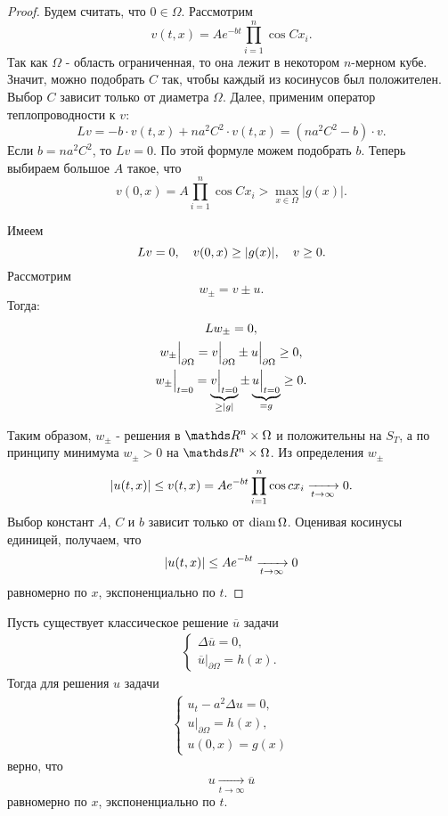 \begin{proof}
Будем считать, что $0 \in \Omega$. Рассмотрим
$$ v(t,x) = A e^{-bt} \prod \limits_{i=1}^n \cos C x_i. $$
Так как $\Omega$ - область ограниченная, то она лежит в некотором $n$-мерном кубе. Значит, можно подобрать $C$ так, чтобы каждый из косинусов был положителен. Выбор $C$ зависит только от диаметра $\Omega$. Далее, применим оператор теплопроводности к $v$:
$$ Lv = -b \cdot v(t,x) + n a^2 C^2 \cdot v(t,x) = (na^2C^2 - b) \cdot v.$$
Если $b = n a^2 C^2$, то $Lv = 0$. По этой формуле можем подобрать $b$. Теперь выбираем большое $A$ такое, что
$$ v(0,x) = A \prod \limits_{i=1}^n \cos C x_i > \max_{x \in \Omega} |g(x)|.$$

Имеем $$Lv = 0,\quad v(0,x) \geq \lvert g(x)\rvert,\quad v \geq 0 .$$ Рассмотрим
$$ w_{\pm} = v \pm u.$$
Тогда:
\begin{gather*}
	Lw_{\pm} = 0, \\
	w_{\pm}\Big\rvert_{\partial \Omega} = v\Big\rvert_{\partial \Omega} \pm u\Big\rvert_{\partial \Omega} \geq 0, \\
	w_{\pm}\Big\rvert_{t=0} = \underbrace {v\Big\rvert_{t=0}}_{\geq \lvert g\rvert} \pm \underbrace{u\Big\rvert_{t=0}}_{=g} \geq 0.
\end{gather*}

Таким образом, $w_{\pm}$ - решения в $\real^n \times \Omega$ и положительны на $S_T$, а по принципу минимума $w_{\pm} > 0$  на $\real^n \times \Omega$. Из определения $w_{\pm}$ 
$$\lvert u(t,x)\rvert \leq v(t,x) = A e^{-bt} \prod \limits_{i=1}^n \cos c x_i \xrightarrow[t \to \infty]{} 0.$$
Выбор констант $A$, $C$ и $b$ зависит только от $\operatorname{diam} \Omega$. Оценивая косинусы единицей, получаем, что
$$ \lvert u(t,x)\rvert \leq A e^{-bt} \xrightarrow[t \to \infty]{} 0$$
равномерно по $x$, экспоненциально по $t$.

\end{proof}


\begin{note} Пусть существует классическое решение $\overline{u}$ задачи
\begin{gather*}
	\begin{cases*}
		\Delta \overline{u} = 0, \\
		\overline{u}\Big\rvert_{\partial \Omega} = h(x).
	\end{cases*}
\end{gather*}
Тогда для решения $u$ задачи 
\begin{gather*}
	\begin{cases*}
		u_t - a^2 \Delta u = 0, \\
		u \Big\rvert_{\partial \Omega} = h(x), \\
		u(0, x) = g(x)
	\end{cases*}
\end{gather*}
верно, что $$u \xrightarrow[t \to \infty]{} \overline{u}$$
равномерно по $x$, экспоненциально по $t$.
\end{note}

